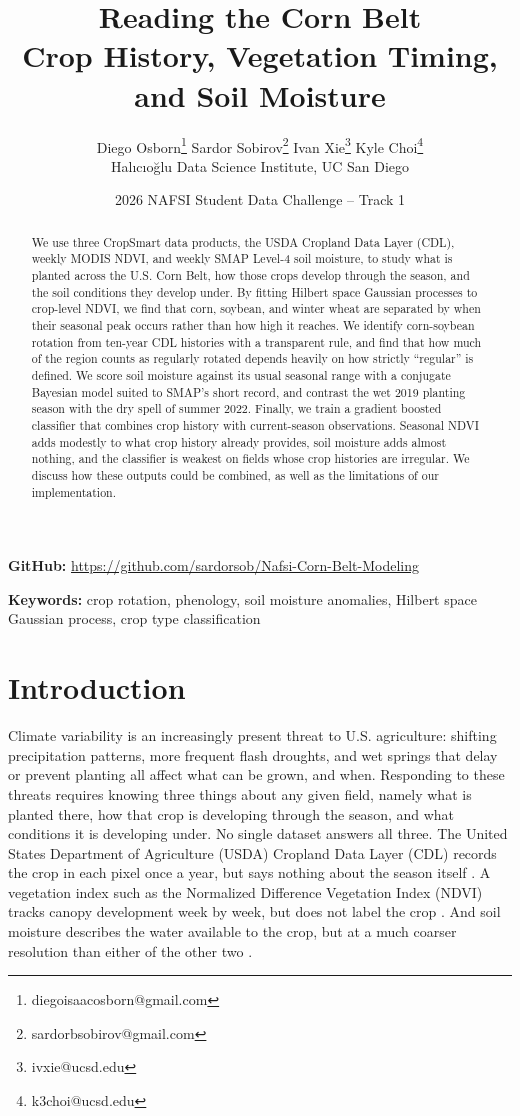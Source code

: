 \documentclass[10pt,letterpaper]{article}
\title{Reading the Corn Belt\\[0.3em]\large Crop History, Vegetation Timing, and Soil Moisture}
\author{Diego Osborn\thanks{diegoisaacosborn@gmail.com} \quad
Sardor Sobirov\thanks{sardorbsobirov@gmail.com} \quad
Ivan Xie\thanks{ivxie@ucsd.edu} \quad
Kyle Choi\thanks{k3choi@ucsd.edu}\\[3pt]
\small Hal{\i}c{\i}o{\u g}lu Data Science Institute, UC San Diego}
\date{\small 2026 NAFSI Student Data Challenge -- Track 1}
\begin{document}
\maketitle
\begin{abstract}

We use three CropSmart data products, the USDA Cropland Data Layer (CDL), weekly MODIS NDVI, and weekly SMAP Level-4 soil moisture, to study what is planted across the U.S. Corn Belt, how those crops develop through the season, and the soil conditions they develop under. By fitting Hilbert space Gaussian processes to crop-level NDVI, we find that corn, soybean, and winter wheat are separated by when their seasonal peak occurs rather than how high it reaches. We identify corn-soybean rotation from ten-year CDL histories with a transparent rule, and find that how much of the region counts as regularly rotated depends heavily on how strictly ``regular'' is defined. We score soil moisture against its usual seasonal range with a conjugate Bayesian model suited to SMAP's short record, and contrast the wet 2019 planting season with the dry spell of summer 2022. Finally, we train a gradient boosted classifier that combines crop history with current-season observations. Seasonal NDVI adds modestly to what crop history already provides, soil moisture adds almost nothing, and the classifier is weakest on fields whose crop histories are irregular. We discuss how these outputs could be combined, as well as the limitations of our implementation.

\end{abstract}

{\centering\small\textbf{GitHub: }\url{https://github.com/sardorsob/Nafsi-Corn-Belt-Modeling}\par}

\noindent\textbf{Keywords:} crop rotation, phenology, soil moisture anomalies, Hilbert space Gaussian process, crop type classification

\section{Introduction}\label{sec:introduction}

Climate variability is an increasingly present threat to U.S. agriculture: shifting precipitation patterns, more frequent flash droughts, and wet springs that delay or prevent planting all affect what can be grown, and when. Responding to these threats requires knowing three things about any given field, namely what is planted there, how that crop is developing through the season, and what conditions it is developing under. No single dataset answers all three. The United States Department of Agriculture (USDA) Cropland Data Layer (CDL) records the crop in each pixel once a year, but says nothing about the season itself \citep{cdl_cropscape}. A vegetation index such as the Normalized Difference Vegetation Index (NDVI) tracks canopy development week by week, but does not label the crop \citep{modis_vi_userguide}. And soil moisture describes the water available to the crop, but at a much coarser resolution than either of the other two \citep{reichle2017smap}.
\end{document}

